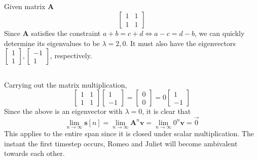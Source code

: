 \documentclass[]{article}
\numberwithin{equation}{section}
\begin{document}
\subsection{}

Given matrix \(\mathbf{A}\)
\begin{equation}
	\begin{bmatrix}
	1 & 1 \\
	1 & 1
	\end{bmatrix}
\end{equation}
Since \(\mathbf{A}\) satisfies the constraint \(a + b = c + d \Leftrightarrow a - c = d - b\), we can quickly determine its eigenvalues to be \(\lambda = 2, 0\). It must also have the eigenvectors \(\begin{bmatrix}
1 \\
1
\end{bmatrix}, \begin{bmatrix}
-1 \\
1
\end{bmatrix}\), respectively. 

\subsection{}

Carrying out the matrix multiplication, 
\begin{equation}
	\begin{bmatrix}
	1 & 1 \\
	1 & 1
	\end{bmatrix}
	\begin{bmatrix}
	1 \\
	-1
	\end{bmatrix}
	=
	\begin{bmatrix}
	0 \\
	0
	\end{bmatrix}
	=
	0\begin{bmatrix}
	1 \\
	-1
	\end{bmatrix}
\end{equation}
Since the above is an eigenvector with \(\lambda = 0\), it is clear that 
\begin{equation}
	\lim_{n \to \infty} \mathbf{s}[n] = \lim_{n \to \infty} \mathbf{A}^n \mathbf{v} = \lim_{n \to \infty} 0^n \mathbf{v} = \vec{0}
\end{equation}
This applies to the entire span since it is closed under scalar multiplication. 
The instant the first timestep occurs, Romeo and Juliet will become ambivalent towards each other. 
\end{document}
